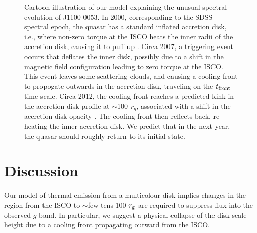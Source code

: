 \documentclass{nature}
\begin{document}
\begin{figure}
{    Cartoon illustration of our model explaining the unusual spectral evolution of J1100-0053. In 2000, corresponding to the SDSS spectral epoch, the quasar has a standard inflated accretion disk, i.e., where non-zero torque at the ISCO heats the inner radii of the accretion disk, causing it to puff up \citep[e.g.,][]{Zimmerman2005}. Circa 2007, a triggering event occurs that deflates the inner disk, possibly due to a shift in the magnetic field configuration leading to zero torque at the ISCO.  This event leaves some scattering clouds, and causing a cooling front to propogate outwards in the accretion disk, traveling on the $t_{\rm front}$ time-scale. Circa 2012, the cooling front reaches a predicted kink in the accretion disk profile at $\sim$100 $r_{g}$, associated with a shift in the accretion disk opacity \citep[e.g., Figure 2 of ][]{Sirko_Goodman2003}.  The cooling front then reflects back, re-heating the inner accretion disk. We predict that in the next year, the quasar should roughly return to its initial state.}
  \label{fig:J110057_diskmodel}
\end{figure}
\section{Discussion}   

Our model of thermal emission from a multicolour disk implies changes in the region from the ISCO to $\sim$few tens-100 $r_{\rm g}$ are required to suppress flux into the observed $g$-band. In particular, we suggest a physical collapse of the disk scale height due to a cooling front propagating outward from the ISCO.
\end{document}
